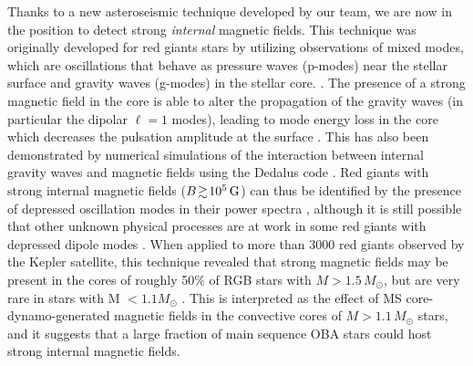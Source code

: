 Thanks to a new asteroseismic technique developed by our team, we are now in the position to detect strong {\it internal} magnetic fields. This technique was originally developed for red giants stars by utilizing observations of mixed modes, which are oscillations that behave as pressure waves (p-modes) near the stellar surface and gravity waves (g-modes) in the stellar core. \citep[e.g][]{Beck_2011}. The presence of a strong magnetic field in the core is able to alter the propagation of the gravity waves (in particular the dipolar $\ell =1$ modes),
leading to mode energy loss in the core which decreases the pulsation amplitude at the surface \citep{Fuller_2015}. This has also been demonstrated by numerical simulations of the interaction between internal gravity waves and magnetic fields using the Dedalus code \citep{Lecoanet_2016}. Red giants with strong internal magnetic fields ($B \! \gtrsim \! 10^5 \, {\rm G}$) can thus be identified by the presence of depressed oscillation modes in their power spectra \citep{Fuller_2015,Stello_2016}, 
although it is still possible that other unknown physical processes are at work in some red giants with depressed dipole modes \citet{Mosser_2017}. When applied to more than 3000 red giants observed by the Kepler satellite, this technique revealed that strong magnetic fields may be present in the cores of roughly 50\% of RGB stars with $M \! > \! 1.5 \, M_\odot$, but are very rare in stars with M $< 1.1M_\odot$ \citep{Stello_2016,Stello_2016a}. This is interpreted as the effect of MS core-dynamo-generated magnetic fields in the convective cores of $M \! > \! 1.1 \, M_\odot$ stars, and it suggests that a large fraction of main sequence OBA stars could host strong internal magnetic fields.
